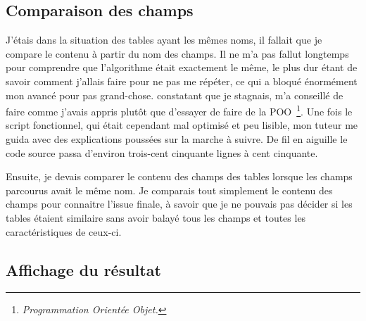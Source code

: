     \subsection{Comparaison des champs} %
    \label{sub:Comparaison des champs}

    J'étais dans la situation des tables ayant les mêmes noms, il fallait
    que je compare le contenu à partir du nom des champs. Il ne m'a pas
    fallut longtemps pour comprendre que l'algorithme était exactement le
    même, le plus dur étant de savoir comment j'allais faire pour ne pas me
    répéter, ce qui a bloqué énormément mon avancé pour pas grand-chose.
     constatant que je stagnais, m'a conseillé de faire
    comme j'avais appris plutôt que d'essayer de faire de la POO\,
    \footnote{\emph{Programmation Orientée Objet.}}.  Une fois le script
    fonctionnel, qui était cependant mal optimisé et peu lisible, mon tuteur
    me guida avec des explications poussées sur la marche à suivre. De fil
    en aiguille le code source passa d'environ trois-cent cinquante lignes à
    cent cinquante.

    Ensuite, je devais comparer le contenu des champs des tables lorsque les
    champs parcourus avait le même nom. Je comparais tout simplement le
    contenu des champs pour connaitre l'issue finale, à savoir que je ne
    pouvais pas décider si les tables étaient similaire sans avoir balayé
    tous les champs et toutes les caractéristiques de ceux-ci.

    \subsection{Affichage du résultat} %
    \label{sub:Affichage du résultat}

